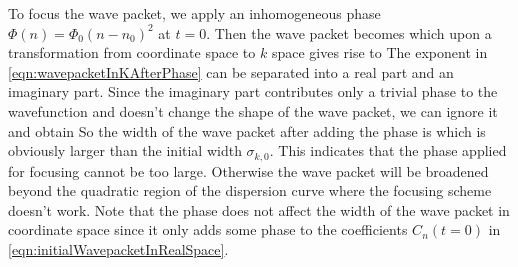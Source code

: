 To focus the wave packet, we apply an inhomogeneous phase $\Phi(n) = \Phi_0 (n-n_0)^2$ at $t=0$.  Then the wave 
packet becomes
which upon a transformation from coordinate space to $k$ space gives rise to
The exponent in \autoref{eqn:wavepacketInKAfterPhase} can be separated into a real part and an imaginary part.
Since the imaginary part contributes only a trivial phase to the wavefunction and doesn't change the shape of the 
wave packet, we can ignore it and obtain
So the width of the wave packet after adding the phase is
which is obviously larger than the initial width  $\sigma_{k, 0}$. This indicates that the phase applied for focusing
cannot be too large. Otherwise the wave packet will be broadened beyond the quadratic region of the dispersion
 curve where the focusing scheme doesn't work. Note that the phase does not affect the width of the wave packet 
 in coordinate space since it only adds some phase to the coefficients $C_n(t=0)$ in
 \autoref{eqn:initialWavepacketInRealSpace}. 

